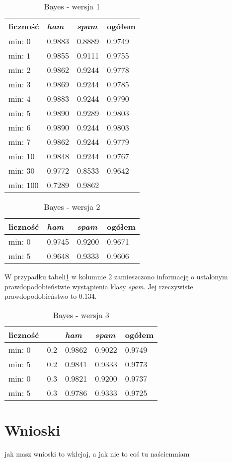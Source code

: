 \documentclass[a4paper,12pt]{article}
\begin{document}
\vspace{0.5cm}

\begin{table}[h!]
\centering
\begin{tabular}{|l||p{2.5cm}|p{2.5cm}||p{2.5cm}|}
\hline
liczność & \textit{ham} & \textit{spam} & ogółem \\ \hline
min: $0$ & 0.9883 & 0.8889 & 0.9749 \\ \hline
min: $1$ & 0.9855 & 0.9111 & 0.9755 \\ \hline
min: $2$ & 0.9862 & 0.9244 & 0.9778 \\ \hline
min: $3$ & 0.9869 & 0.9244 & 0.9785 \\ \hline
min: $4$ & 0.9883 & 0.9244 & 0.9790 \\ \hline
min: $5$ & 0.9890 & 0.9289 & 0.9803 \\ \hline
min: $6$ & 0.9890 & 0.9244 & 0.9803 \\ \hline
min: $7$ & 0.9862 & 0.9244 & 0.9779 \\ \hline
min: $10$ & 0.9848 & 0.9244 & 0.9767 \\ \hline
min: $30$ & 0.9772 & 0.8533 & 0.9642 \\ \hline
min: $100$ & 0.7289 & 0.9862 & \\ \hline

\end{tabular}
\caption{Bayes - wersja 1}
\end{table}

\begin{table}[h!]
\centering
\begin{tabular}{|l||p{2.5cm}|p{2.5cm}||p{2.5cm}|}
\hline
liczność & \textit{ham} & \textit{spam} & ogółem \\ 
\hline

min: $0$ & 0.9745 & 0.9200 & 0.9671 \\ \hline
min: $5$ & 0.9648 & 0.9333 & 0.9606 \\ \hline

\end{tabular}
\caption{Bayes - wersja 2}
\end{table}

W przypadku tabeli\ref{bayes:tab3} w kolumnie 2 zamieszczono informację o ustalonym prawdopodobieństwie
wystąpienia klasy \textit{spam}. Jej rzeczywiste prawdopodobieństwo to $0.134$.

\begin{table}[h!]
\centering
\begin{tabular}{|l|l||p{2.5cm}|p{2.5cm}||p{2.5cm}|}
\hline
liczność &  & \textit{ham} & \textit{spam} & ogółem \\ 
\hline

min: $0$ & 0.2 & 0.9862 & 0.9022 & 0.9749 \\ \hline
min: $5$ & 0.2 & 0.9841 & 0.9333 & 0.9773 \\ \hline
min: $0$ & 0.3 & 0.9821 & 0.9200 & 0.9737 \\ \hline
min: $5$ & 0.3 & 0.9786 & 0.9333 & 0.9725 \\ \hline

\end{tabular}
\caption{Bayes - wersja 3}
\label{bayes:tab3}
\end{table}

\section{Wnioski}

jak masz wnioski to wklejaj, a jak nie to coś tu naściemniam
\end{document}
